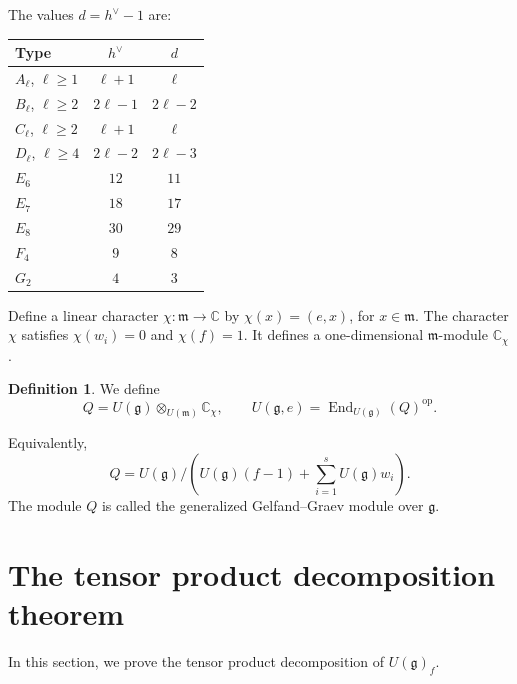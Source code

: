 \documentclass[12pt,a4paper]{amsart}
\numberwithin{equation}{section}
\theoremstyle{definition}
\newtheorem{definition}[theorem]{Definition}
\theoremstyle{remark}
\newcommand{\C}{\mathbb{C}}
\newcommand{\g}{\mathfrak g}
\newcommand{\m}{\mathfrak m}
\newcommand{\End}{\operatorname{End}}
\newcommand{\Oe}{\mathcal O_e}
\newcommand{\Uf}{U(\g)_f}
\begin{document}

The values \(d=h^\vee-1\) are:
\begin{center}
\begin{tabular}{@{}lcc@{}}
\toprule
Type & \(h^\vee\) &  \(d\)\\
\midrule
\(A_\ell\), \(\ell\geq1\) & \(\ell+1\) & \(\ell\)\\
\(B_\ell\), \(\ell\geq2\) & \(2\ell-1\) & \(2\ell-2\)\\
\(C_\ell\), \(\ell\geq2\) & \(\ell+1\) & \(\ell\)\\
\(D_\ell\), \(\ell\geq4\) & \(2\ell-2\) & \(2\ell-3\)\\
\(E_6\) & \(12\) & \(11\)\\
\(E_7\) & \(18\) & \(17\)\\
\(E_8\) & \(30\) & \(29\)\\
\(F_4\) & \(9\) & \(8\)\\
\(G_2\) & \(4\) & \(3\)\\
\bottomrule
\end{tabular}
\end{center}

 Define a linear character  $\chi:\m\rightarrow \C$ by
$\chi(x)=(e,x)$, for $x\in\m$. The character \(\chi\) satisfies
\(\chi(w_i)=0\) and \(\chi(f)=1\). It  defines a one-dimensional $\m$-module $\C_\chi$.

\begin{definition}\cite{Pr1}\label{def:W}
We  define
\[
 Q=U(\g)\otimes_{U(\m)}\C_\chi,\qquad
 U(\g,e)=\End_{U(\g)}(Q)^{\mathrm{op}}.
\]
\end{definition}

Equivalently,
\[
 Q=U(\g)\big/
 (U(\g)(f-1)+\sum_{i=1}^s U(\g)w_i).
\]
The module $Q$ is called the  generalized Gelfand--Graev  module over $\g$.






\section{The tensor product decomposition theorem}
\label{sec:tensor}

In this section, we prove the tensor product decomposition of $\Uf$.
\end{document}
